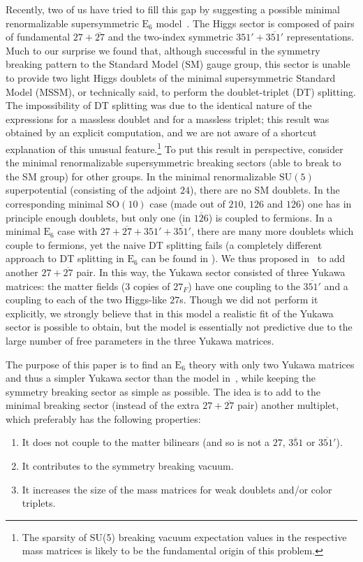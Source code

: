 \documentclass[a4paper,12pt]{article}
\def\SU{\mathrm{SU}}
\def\SO{\mathrm{SO}}
\def\EE{\mathrm{E}_6}
\begin{document}
Recently, two of us have tried to fill this gap by suggesting a possible minimal renormalizable supersymmetric $\EE$
model~\cite{Bajc:2013qra}. The Higgs sector is composed of pairs of fundamental $27+\overline{27}$ and the two-index symmetric $351'+\overline{351'}$ representations. Much to our surprise we found that, although successful in the symmetry breaking pattern to the Standard Model (SM) gauge group, this sector is unable to provide two light Higgs doublets
of the minimal supersymmetric Standard Model (MSSM), or technically said, to perform the doublet-triplet (DT) splitting.
The impossibility of DT splitting was due to the identical nature of the expressions for a massless doublet and for a
massless triplet; this result was obtained by an explicit computation, and we are not aware of a shortcut explanation of this unusual feature.\footnote{The sparsity of SU(5) breaking vacuum expectation values in the respective mass matrices is likely to be the fundamental origin of this problem.} To put this result in perspective, consider the minimal renormalizable supersymmetric breaking sectors (able to break to the SM group) for other groups. In the minimal renormalizable $\SU(5)$ superpotential (consisting of the adjoint $24$), there are no SM doublets. In the corresponding minimal $\SO(10)$ case (made out of $210$, $126$ and
$\overline{126}$) one has in principle enough doublets, but only one (in $\overline{126}$) is coupled to fermions. In a minimal $\EE$ case
with $27+\overline{27}+351'+\overline{351'}$, there are many more doublets which couple to fermions, yet the naive DT splitting fails (a completely different approach to DT splitting in $\mathrm{E}_6$ can be found in \cite{Maekawa:2002bk}).
We thus proposed in~\cite{Bajc:2013qra} to add another $27+\overline{27}$ pair. In this way, the Yukawa sector consisted of three Yukawa matrices: the matter fields (3 copies of $27_F$) have one coupling to the $\overline{351'}$ and a coupling to each of the two Higgs-like $27$s. Though we did not perform it explicitly, we strongly believe that in this model a realistic fit of the Yukawa sector is possible to obtain, but the
model is essentially not predictive due to the large number of free parameters in the three Yukawa matrices.

The purpose of this paper is to find an $\EE$ theory with only two Yukawa matrices and thus a simpler Yukawa sector than the model in~\cite{Bajc:2013qra}, while keeping the symmetry breaking sector as simple as possible. The idea is to add to the minimal breaking sector (instead of the extra $27+\overline{27}$ pair) another multiplet, which preferably has the following properties:
\begin{enumerate}
\item It does not couple to the matter bilinears (and so is not a $27$, $\overline{351}$ or $\overline{351'}$).
\item It contributes to the symmetry breaking vacuum.
\item It increases the size of the mass matrices for weak doublets and/or color triplets.
\end{enumerate}
\end{document}
